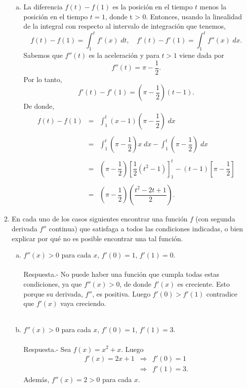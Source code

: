 \begin{enumerate}[\bfseries 1.]
\begin{enumerate}[a)]
	\item La diferencia $f(t) - f(1)$ es la posición en el tiempo $t$ menos la posición en el tiempo $t = 1$, donde t > 0. Entonces, usando la linealidad de la integral con respecto al intervalo de integración que tenemos, 
	    $$f(t)-f(1)=\int_1^t f'(x)\; dt,\quad f'(t)-f'(1)=\int_1^t f''(x)\; dx.$$
	    Sabemos que $f''(t)$ es la aceleración y para $t>1$ viene dada por 
	    $$f''(t)=\pi-\dfrac{1}{2}.$$
	    Por lo tanto,
	    $$f'(t)-f'(1)=\left(\pi-\dfrac{1}{2}\right)(t-1).$$
	    De donde,
	    $$\begin{array}{rcl}
		f(t)-f(1)&=&\displaystyle\int_1^t (x-1)\left(\pi-\dfrac{1}{2}\right)\; dx\\\\
			 &=&\displaystyle\int_1^t \left(\pi-\dfrac{1}{2}\right)x\; dx - \int_1^t\left(\pi-\dfrac{1}{2}\right)\; dx\\\\
			 &=&\left(\pi-\dfrac{1}{2}\right)\left[\dfrac{1}{2}(t^2-1)\right]_1^t - \left(t-1\right)\left[\pi-\dfrac{1}{2}\right]\\\\
			 &=&\left(\pi-\dfrac{1}{2}\right)\left(\dfrac{t^2-2t+1}{2}\right).
	    \end{array}$$
	    \vspace{.5cm}

	\end{enumerate}

    \item En cada uno de los casos siguientes encontrar una función $f$ (con segunda derivada $f''$ continua) que satisfaga a todos las condiciones indicadas, o bien explicar por qué no es posible encontrar una tal función.

	\begin{enumerate}[(a)]

	    \item $f''(x)>0$ para cada $x$, $f'(0)=1$, $f'(1)=0.$\\\\
		Respuesta.-\; No puede haber una función que cumpla todas estas condiciones, ya que $f''(x)>0$, de donde $f'(x)$ es creciente. Esto porque su derivada, $f''$, es positiva. Luego $f'(0)>f'(1)$ contradice que $f'(x)$ vaya creciendo.\\\\

	    \item $f''(x)>0$ para cada $x$, $f'(0)=1$, $f'(1)=3$.\\\\
		Respuesta.-\; Sea $f(x)=x^2+x$. Luego
		$$\begin{array}{rcl}
		    f'(x)=2x+1&\Rightarrow & f'(0)=1\\
			      &\Rightarrow& f'(1)=3.
		\end{array}$$
		Además, $f''(x)=2>0$ para cada $x$.\\\\


\end{enumerate}
\end{enumerate}

